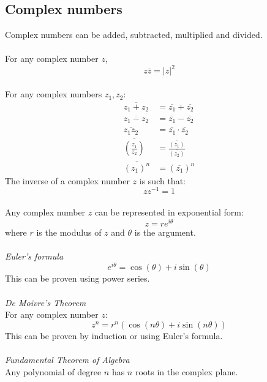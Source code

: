 \documentclass{scrartcl}
\begin{document}
\subsection{Complex numbers}
Complex numbers can be added, subtracted, multiplied and divided.
\\\\
For any complex number $ z $,
\begin{equation}
z \overline{z} = |z| ^{2}
\end{equation}
\\
For any complex numbers $ z_{1}, z_{2} $:
\begin{align}
\overline{z_{1} + z_{2}} & = \overline{z_{1}} + \overline{z_{2}} \\
\overline{z_{1} - z_{2}} & = \overline{z_{1}} - \overline{z_{2}} \\
\overline{z_{1} z_{2}} & = \overline{z_{1}} \cdot \overline{z_{2}} \\
\overline{(\frac{z_{1}}{z_{2}})} & = \frac{\overline{(z_{1})}}{\overline{(z_{2})}} \\
\overline{(z_{1})^{n}} & = (\overline{z_{1}})^{n}
\end{align}
The inverse of a complex number $ z $ is such that:
\begin{equation}
z z^{-1} = 1
\end{equation}
\\
Any complex number $ z $ can be represented in exponential form:
\begin{equation}
z = r e^{i \theta}
\end{equation}
where $ r $ is the modulus of $ z $ and $ \theta $ is the argument.
\\\\
\textit{Euler's formula}
\begin{equation}
e^{i \theta} = \cos(\theta) + i \sin(\theta)
\end{equation}
This can be proven using power series.
\\\\
\textit{De Moivre's Theorem}
\\
For any complex number $ z $:
\begin{equation}
z^{n} = r^{n} (\cos(n \theta) + i \sin(n \theta))
\end{equation}
This can be proven by induction or using Euler's formula.
\\\\
\textit{Fundamental Theorem of Algebra}
\\
Any polynomial of degree $ n $ has $ n $ roots in the complex plane.
\end{document}
